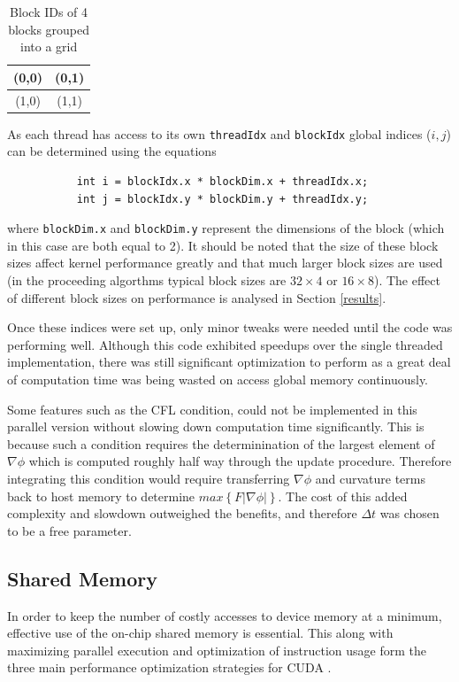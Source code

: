 \begin{table}
\begin{center}
  \begin{tabular}{ | c | c |}
    \hline
    (0,0) & (0,1)  \\ \hline
    (1,0) & (1,1)  \\ \hline
  \end{tabular}
\end{center}
\label{table:blocks}\caption{Block IDs of 4 blocks grouped into a grid}
\end{table}

As each thread has access to its own \texttt{threadIdx} and \texttt{blockIdx} global indices ($i,j$) can be determined using the equations

\begin{verbatim}
           int i = blockIdx.x * blockDim.x + threadIdx.x;
           int j = blockIdx.y * blockDim.y + threadIdx.y;
\end{verbatim}

where \texttt{blockDim.x} and \texttt{blockDim.y} represent the dimensions of the block (which in this case are both equal to 2). It should be noted that the size of these block sizes affect kernel performance greatly and that much larger block sizes are used (in the proceeding algorthms typical block sizes are $32\times 4$ or $16 \times 8$). The effect of different block sizes on performance is analysed in Section \ref{results}.

Once these indices were set up, only minor tweaks were needed until the code was performing well. Although this code exhibited speedups over the single threaded implementation, there was still significant optimization to perform as a great deal of computation time was being wasted on access global memory continuously.

Some features such as the CFL condition, could not be implemented in this parallel version without slowing down computation time significantly. This is because such a condition requires the determinination of the largest element of $\nabla\phi$ which is computed roughly half way through the update procedure. Therefore integrating this condition would require transferring $\nabla\phi$ and curvature terms back to host memory to determine $max\left\{F|\nabla\phi|\right\}$. The cost of this added complexity and slowdown outweighed the benefits, and therefore $\Delta t$ was chosen to be a free parameter.

	\subsection{Shared Memory}
In order to keep the number of costly accesses to device memory at a minimum, effective use of the on-chip shared memory is essential. This along with maximizing parallel execution and optimization of instruction usage form the three main performance optimization strategies for CUDA \cite{cuda}.